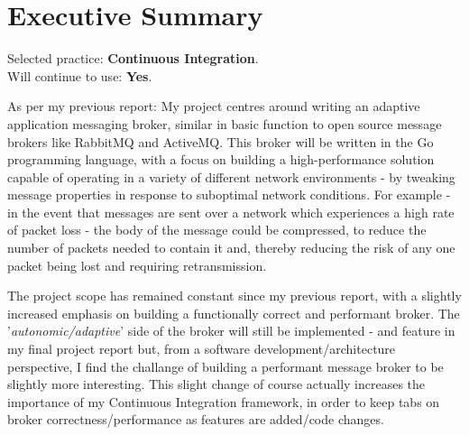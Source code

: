 \section{Executive Summary}
\label{sec:Executive Summary}

Selected practice: \textbf{Continuous Integration}.\\
Will continue to use: \textbf{Yes}.

As per my previous report: My project centres around writing an adaptive
application messaging broker, similar in basic function to open source message
brokers like RabbitMQ and ActiveMQ. This broker will be written in the Go
programming language, with a focus on building a high-performance solution
capable of operating in a variety of different network environments - by
tweaking message properties in response to suboptimal network conditions.
For example - in the event that messages are sent over a network which
experiences a high rate of packet loss - the body of the message could be
compressed, to reduce the number of packets needed to contain it and, thereby
reducing the risk of any one packet being lost and requiring retransmission.

The project scope has remained constant since my previous report, with a
slightly increased emphasis on building a functionally correct and performant
broker. The '\emph{autonomic/adaptive}' side of the broker will still be
implemented - and feature in my final project report but, from a software
development/architecture perspective, I find the challange of building a
performant message broker to be slightly more interesting. This slight change of
course actually increases the importance of my Continuous Integration framework,
in order to keep tabs on broker correctness/performance as features are added/code
changes.

